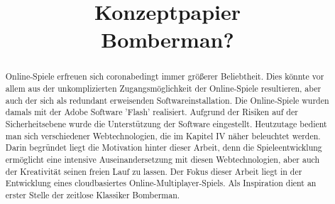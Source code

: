 \documentclass[conference]{IEEEtran}
\begin{document}
\title{Konzeptpapier\\Bomberman?}

\author{
	\and

	\and

	\and

	\and

}

\maketitle

\begin{abstract}
	Online-Spiele erfreuen sich coronabedingt immer größerer Beliebtheit. Dies könnte vor allem aus der unkomplizierten Zugangsmöglichkeit der Online-Spiele resultieren, aber auch der sich als redundant erweisenden Softwareinstallation. Die 
	Online-Spiele wurden damals mit der Adobe Software 'Flash' realisiert. Aufgrund der Risiken auf der Sicherheitsebene wurde die Unterstützung der Software eingestellt. Heutzutage bedient man sich verschiedener Webtechnologien, die im Kapitel IV näher beleuchtet werden.
	Darin begründet liegt die Motivation hinter dieser Arbeit, denn 
	die Spieleentwicklung ermöglicht eine intensive Auseinandersetzung mit diesen Webtechnologien, aber auch der Kreativität seinen freien Lauf zu lassen.
	Der Fokus dieser Arbeit liegt in der Entwicklung eines cloudbasiertes Online-Multiplayer-Spiels. Als Inspiration dient an erster Stelle der zeitlose Klassiker \glqq Bomberman\grqq{}.
\end{abstract}
\end{document}
